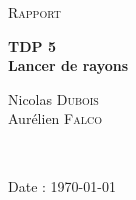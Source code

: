 \documentclass[12pt]{article}
\begin{document}
\begin{titlepage}
\begin{center}
\vspace*{3cm}
\textsc{\Large Rapport}\\[1.5cm]
\vspace{1cm}

	{ \huge \bfseries TDP 5\\[0.4cm] }
	{ \bfseries Lancer de rayons\\[0.4cm] }

\vspace{3cm}

	\begin{minipage}{0.5\textwidth}
	    \begin{center} \large
	             Nicolas \textsc{Dubois}\\
	             Aurélien \textsc{Falco}\\
	    \end{center}
	\end{minipage}
	\\[2cm]
    \end{center}

\vspace*{4cm}
\begin{flushright}Date : \today\end{flushright}
\end{titlepage}





\end{document}
